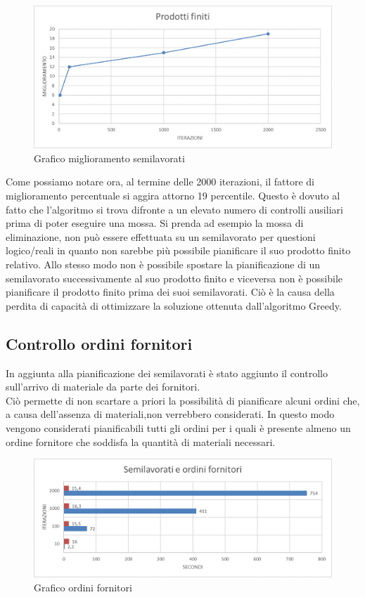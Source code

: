 \begin{figure}[H]
	\includegraphics[width=13cm]{immagini/graficosl3.png}
	\centering
	\caption{Grafico miglioramento semilavorati}
\end{figure}

Come possiamo notare ora, al termine delle 2000 iterazioni, il fattore di miglioramento percentuale si aggira attorno 19 percentile. Questo è dovuto al fatto che l'algoritmo
si trova difronte a un elevato numero di controlli ausiliari prima di poter eseguire una mossa. Si prenda ad esempio la mossa di eliminazione, non può essere effettuata su un semilavorato
per questioni logico/reali in quanto non sarebbe più possibile pianificare il suo prodotto finito relativo. Allo stesso modo non è possibile spostare la pianificazione di un
semilavorato successivamente al suo prodotto finito e viceversa non è possibile pianificare il prodotto finito prima dei suoi semilavorati. Ciò è la causa della perdita di
capacità di ottimizzare la soluzione ottenuta dall'algoritmo Greedy.

\newpage
\subsection{Controllo ordini fornitori}

In aggiunta alla pianificazione dei semilavorati è stato aggiunto il controllo sull'arrivo di materiale da parte dei fornitori.\\Ciò permette di non scartare a priori la possibilità
di pianificare alcuni ordini che, a causa dell'assenza di materiali,non verrebbero considerati. In questo modo vengono considerati pianificabili tutti gli ordini per i quali
è presente almeno un ordine fornitore che soddisfa la quantità di materiali necessari. 

\begin{figure}[H]
	\includegraphics[width=13cm]{immagini/graficofo.png}
	\centering
	\caption{Grafico ordini fornitori}
\end{figure}

